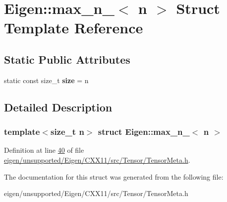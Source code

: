 \hypertarget{struct_eigen_1_1max__n__1}{}\section{Eigen\+:\+:max\+\_\+n\+\_$<$ n $>$ Struct Template Reference}
\label{struct_eigen_1_1max__n__1}
\subsection*{Static Public Attributes}
\begin{DoxyCompactItemize}
\item 
\mbox{\label{struct_eigen_1_1max__n__1_af74fe97e1557c8b3570a066e9b373df5}} 
static const size\+\_\+t {\bfseries size} = n
\end{DoxyCompactItemize}


\subsection{Detailed Description}
\subsubsection*{template$<$size\+\_\+t n$>$\newline
struct Eigen\+::max\+\_\+n\+\_$<$ n $>$}



Definition at line \hyperlink{eigen_2unsupported_2_eigen_2_c_x_x11_2src_2_tensor_2_tensor_meta_8h_source_l00040}{40} of file \hyperlink{eigen_2unsupported_2_eigen_2_c_x_x11_2src_2_tensor_2_tensor_meta_8h_source}{eigen/unsupported/\+Eigen/\+C\+X\+X11/src/\+Tensor/\+Tensor\+Meta.\+h}.



The documentation for this struct was generated from the following file\+:\begin{DoxyCompactItemize}
\item 
eigen/unsupported/\+Eigen/\+C\+X\+X11/src/\+Tensor/\+Tensor\+Meta.\+h\end{DoxyCompactItemize}
